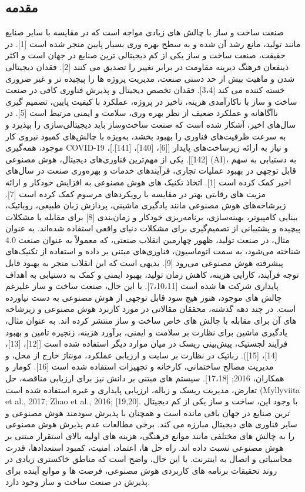 \documentclass[towcolumn, 11pt]{Article}
\begin{document}
\begin{چکیده}
\section{مقدمه}
صنعت ساخت و ساز با چالش های زیادی مواجه است که در مقایسه با سایر صنایع مانند تولید، مانع رشد آن شده و به سطح بهره وری بسیار پایین منجر شده است [1]. در حقیقت، صنعت ساخت و ساز یکی از کم دیجیتالی ترین صنایع در جهان است و اکثر ذینفعان فرهنگ دیرینه مقاومت در برابر تغییر را تصدیق می کنند [2]. فقدان دیجیتالی شدن و ماهیت بیش از حد دستی صنعت، مدیریت پروژه ها را پیچیده تر و غیر ضروری خسته کننده می کند [3،4]. فقدان تخصص دیجیتال و پذیرش فناوری کافی در صنعت ساخت و ساز با ناکارآمدی هزینه، تاخیر در پروژه، عملکرد با کیفیت پایین، تصمیم گیری ناآگاهانه و عملکرد ضعیف از نظر بهره وری، سلامت و ایمنی مرتبط است [5]. در سال‌های اخیر، آشکار شده است که صنعت ساخت‌وساز باید دیجیتالی‌سازی را بپذیرد و به سرعت ظرفیت‌های فناوری را بهبود بخشد، به‌ویژه با چالش‌های کمبود نیروی کار موجود، همه‌گیری COVID-19 و نیاز به ارائه زیرساخت‌های پایدار [[6]، [140]، [141].]، [142]].
یکی از مهم‌ترین فناوری‌های دیجیتال، هوش مصنوعی (AI)، به دستیابی به سهم قابل توجهی در بهبود عملیات تجاری، فرآیندهای خدمات و بهره‌وری صنعت در سال‌های اخیر کمک کرده است [1]. اتخاذ تکنیک های هوش مصنوعی به افزایش خودکار و ارائه مزیت های رقابتی بهتر در مقایسه با رویکردهای مرسوم کمک کرده است [7]. زیرشاخه‌های هوش مصنوعی مانند یادگیری ماشینی، پردازش زبان طبیعی، روباتیک، بینایی کامپیوتر، بهینه‌سازی، برنامه‌ریزی خودکار و زمان‌بندی [8] برای مقابله با مشکلات پیچیده و پشتیبانی از تصمیم‌گیری برای مشکلات دنیای واقعی استفاده شده‌اند. به عنوان مثال، در صنعت تولید، ظهور چهارمین انقلاب صنعتی، که معمولاً به عنوان صنعت 4.0 شناخته می‌شود، به سمت اتوماسیون، فناوری‌های مبتنی بر داده و استفاده از تکنیک‌های پیشرفته هوش مصنوعی می‌رود [9]. بدیهی است که این انقلاب منجر به بهبود قابل توجه فرآیند، کارایی هزینه، کاهش زمان تولید، بهبود ایمنی و کمک به دستیابی به اهداف پایداری شرکت ها شده است [7،10،11]. با این حال، صنعت ساخت و ساز علیرغم چالش های موجود، هنوز هیچ سود قابل توجهی از هوش مصنوعی به دست نیاورده است.
در چند دهه گذشته، محققان مقالاتی در مورد کاربرد هوش مصنوعی و زیرشاخه های آن برای مقابله با چالش های خاص ساخت و ساز منتشر کرده اند. به عنوان مثال، یادگیری ماشین برای نظارت بر سلامت و ایمنی، برآورد هزینه، زنجیره تامین و بهبود فرآیند لجستیک، پیش‌بینی ریسک در میان موارد دیگر استفاده شده است [[12]، [13]، [14]، [15]). رباتیک در نظارت بر سایت و ارزیابی عملکرد، مونتاژ خارج از محل، و مدیریت مصالح ساختمانی، کارخانه و تجهیزات استفاده شده است [16]. کومار و همکاران، 2016; [17،18]. سیستم های مبتنی بر دانش نیز برای ارزیابی مناقصه، حل تعارض، مدیریت ریسک و زباله، ارزیابی پایداری و غیره استفاده شده است (Myllyviita et al., 2017; Zhao et al., 2016; [19,20]. با وجود این، ساخت و ساز یکی از کم دیجیتال ترین صنایع در جهان باقی مانده است و همچنان با پذیرش سودمند هوش مصنوعی و سایر فناوری های دیجیتال مبارزه می کند. برخی مطالعات عدم پذیرش هوش مصنوعی را به چالش های مختلفی مانند موانع فرهنگی، هزینه های اولیه بالای استقرار مبتنی بر هوش مصنوعی نسبت داده اند. راه حل ها، اعتماد، امنیت، کمبود استعدادها، قدرت محاسباتی و اتصال به اینترنت. با این حال، واضح است که مناطق خاکستری زیادی در روند تحقیقات برنامه های کاربردی هوش مصنوعی، فرصت ها و موانع آینده برای پذیرش در صنعت ساخت و ساز وجود دارد.


\end{چکیده}
\end{document}
